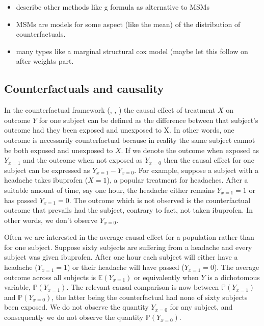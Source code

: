 \documentclass[11pt]{article}
\providecommand{\tightlist}{%
      \setlength{\itemsep}{0pt}\setlength{\parskip}{0pt}}
\begin{document}
\begin{itemize}
\tightlist
\item
  describe other methods like g formula as alternative to MSMs
\item
  MSMs are models for some aspect (like the mean) of the distribution of
  counterfactuals.
\item
  many types like a marginal structural cox model (maybe let this follow
  on after weights part.
\end{itemize}

    \subsection{Counterfactuals and
causality}\label{counterfactuals-and-causality}

In the counterfactual framework (\citet{Neyman1923}, \citet{Rubin1978},
\citet{Robins1986}) the causal effect of treatment \(X\) on outcome
\(Y\) for one subject can be defined as the difference between that
subject's outcome had they been exposed and unexposed to X. In other
words, one outcome is necessarily counterfactual because in reality the
same subject cannot be both exposed and unexposed to \(X\). If we denote
the outcome when exposed as \(Y_{x=1}\) and the outcome when not exposed
as \(Y_{x=0}\) then the causal effect for one subject can be expressed
as \(Y_{x=1} - Y_{x=0}\). For example, suppose a subject with a headache
takes ibuprofen (\(X = 1\)), a popular treatment for headaches. After a
suitable amount of time, say one hour, the headache either remains
\(Y_{x=1} = 1\) or has passed \(Y_{x=1} = 0\). The outcome which is not
observed is the counterfactual outcome that prevails had the subject,
contrary to fact, not taken ibuprofen. In other words, we don't observe
\(Y_{x=0}\). \linebreak

Often we are interested in the average causal effect for a population
rather than for one subject. Suppose sixty subjects are suffering from a
headache and every subject was given ibuprofen. After one hour each
subject will either have a headache (\(Y_{x=1}=1\)) or their headache
will have passed (\(Y_{x=1}=0\)). The average outcome across all
subjects is \(\mathbb{E}(Y_{x = 1})\) or equivalently when \(Y\) is a
dichotomous variable, \(\mathbb{P}(Y_{x = 1})\). The relevant causal
comparison is now between \(\mathbb{P}(Y_{x = 1})\) and
\(\mathbb{P}(Y_{x = 0})\), the latter being the counterfactual had none
of sixty subjects been exposed. We do not observe the quantity
\(Y_{x=0}\) for any subject, and consequently we do not observe the
quantity \(\mathbb{P}(Y_{x = 0})\). \linebreak
\end{document}
